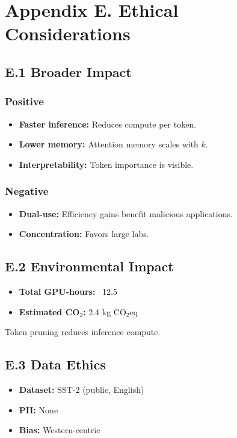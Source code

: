 
\section{Appendix E. Ethical Considerations}

\subsection{E.1 Broader Impact}

\subsubsection{Positive}
\begin{itemize}
\item \textbf{Faster inference:} Reduces compute per token.
\item \textbf{Lower memory:} Attention memory scales with $k$.
\item \textbf{Interpretability:} Token importance is visible.

\end{itemize}
\subsubsection{Negative}
\begin{itemize}
\item \textbf{Dual-use:} Efficiency gains benefit malicious applications.
\item \textbf{Concentration:} Favors large labs.

\end{itemize}
\subsection{E.2 Environmental Impact}

\begin{itemize}
\item \textbf{Total GPU-hours:} ~12.5
\item \textbf{Estimated CO$_2$:} 2.4 kg CO$_2$eq

\end{itemize}
Token pruning reduces inference compute.

\subsection{E.3 Data Ethics}

\begin{itemize}
\item \textbf{Dataset:} SST-2 (public, English)
\item \textbf{PII:} None
\item \textbf{Bias:} Western-centric

\end{itemize}
